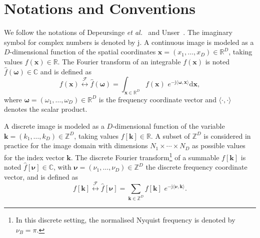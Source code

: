 \documentclass[fleqn,a4paper,oneside,openany]{book}
\begin{document}
\section{Notations and Conventions}\label{sec:notations}
%
We follow the notations of Depeursinge \textit{et al.}~\cite{DFA2017} and Unser~\cite{Uns2012}.
The imaginary symbol for complex numbers is denoted by $\mathrm{j}$.
A continuous image is modeled as a $D$-dimensional function of the spatial coordinates $\boldsymbol{x} = (x_1, \dots , x_D) \in \mathbb{R}^D$, taking values $f(\boldsymbol{x}) \in \mathbb{R}$. 
The Fourier transform of an integrable $f(\boldsymbol{x})$ is noted $\hat{f}(\boldsymbol{\omega})\in\mathbb{C}$ and is defined as
\begin{equation}\label{eq:continuousFourierTransform}
f(\boldsymbol{x})\overset{\mathcal{F}}{\longleftrightarrow}\hat{f}(\boldsymbol{\omega})=
\int_{\boldsymbol{x}\in\mathbb{R}^D} f(\boldsymbol{x}) \,\, e^{-\mathrm{j}\langle\boldsymbol{\omega},\boldsymbol{x}\rangle} \mathrm{d}\boldsymbol{x},
\end{equation}
where $\boldsymbol{\omega}=(\omega_1,\dots,\omega_D) \in \mathbb{R}^D$ is the frequency coordinate vector and $\langle\cdot,\cdot\rangle$ denotes the scalar product.

A discrete image is modeled as a $D$-dimensional function of the variable $\boldsymbol{k} = (k_1, \dots , k_D) \in \mathbb{Z}^D$, taking values $f[\boldsymbol{k}] \in \mathbb{R}$. 
A subset of $\mathbb{Z}^D$ is considered in practice for the image domain with dimensions $N_1\times\cdots\times N_D$ as possible values for the index vector $\boldsymbol{k}$.
The discrete Fourier transform\footnote{In this discrete setting, the normalised Nyquist frequency is denoted by $\nu_B=\pi$.} of a summable $f[\boldsymbol{k}]$ is noted $\hat{f}[\boldsymbol{\nu}]\in\mathbb{C}$, with $\boldsymbol{\nu}=(\nu_1,\dots,\nu_D) \in \mathbb{Z}^D$ the discrete frequency coordinate vector, and is defined as
\begin{equation}\label{eq:discreteFourierTransform}
f[\boldsymbol{k}]\overset{\mathcal{F}}{\longleftrightarrow}\hat{f}[\boldsymbol{\nu}]=
\sum_{\boldsymbol{k}\in\mathbb{Z}^D} f[\boldsymbol{k}] \,\, e^{-\mathrm{j}\langle\boldsymbol{\nu},\boldsymbol{k}\rangle}.
\end{equation}
\end{document}
